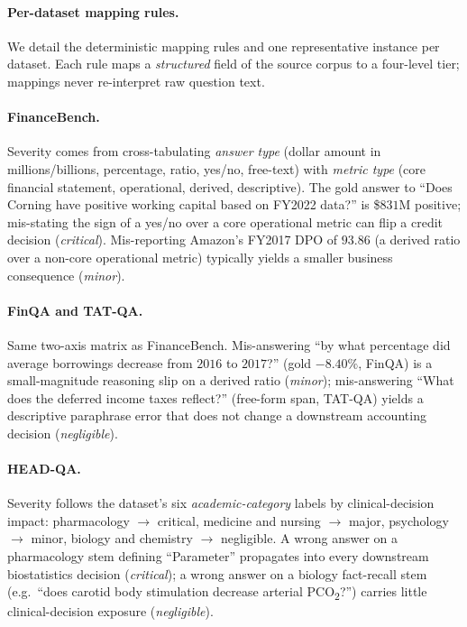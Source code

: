\documentclass[11pt]{article}
\begin{document}
\paragraph{Per-dataset mapping rules.}
We detail the deterministic mapping rules and one representative
instance per dataset. Each rule maps a \emph{structured} field
of the source corpus to a four-level tier; mappings never
re-interpret raw question text.

\paragraph{FinanceBench.}
Severity comes from cross-tabulating \emph{answer type} (dollar
amount in millions/billions, percentage, ratio, yes/no,
free-text) with \emph{metric type} (core financial statement,
operational, derived, descriptive). The gold answer to \enquote{Does
Corning have positive working capital based on FY2022 data?}
is \$$831$M positive; mis-stating the sign of a yes/no over a
core operational metric can flip a credit decision
(\emph{critical}). Mis-reporting Amazon's FY2017 DPO of
$93.86$ (a derived ratio over a non-core operational metric)
typically yields a smaller business consequence (\emph{minor}).

\paragraph{FinQA and TAT-QA.}
Same two-axis matrix as FinanceBench. Mis-answering \enquote{by what
percentage did average borrowings decrease from $2016$ to
$2017$?} (gold $-8.40\%$, FinQA) is a small-magnitude reasoning
slip on a derived ratio (\emph{minor}); mis-answering \enquote{What
does the deferred income taxes reflect?} (free-form span,
TAT-QA) yields a descriptive paraphrase error that does not
change a downstream accounting decision (\emph{negligible}).

\paragraph{HEAD-QA.}
Severity follows the dataset's six \emph{academic-category}
labels by clinical-decision impact: pharmacology
$\to$ critical, medicine and nursing $\to$ major, psychology
$\to$ minor, biology and chemistry $\to$ negligible. A wrong
answer on a pharmacology stem defining \enquote{Parameter} propagates
into every downstream biostatistics decision
(\emph{critical}); a wrong answer on a biology fact-recall
stem (e.g.\ \enquote{does carotid body stimulation decrease arterial
PCO\textsubscript{2}?}) carries little clinical-decision
exposure (\emph{negligible}).
\end{document}
